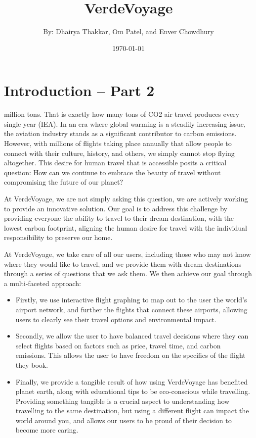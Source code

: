 \documentclass[11pt]{article}
\title{VerdeVoyage}
\author{By: Dhairya Thakkar, Om Patel, and Enver Chowdhury}
\date{\today}
\begin{document}
\maketitle

\section*{Introduction -- Part 2}

 million tons. That is exactly how many tons of CO2 air travel produces every single year (IEA). In an era where global warming is a steadily increasing issue, the aviation industry stands as a significant contributor to carbon emissions. However, with millions of flights taking place annually that allow people to connect with their culture, history, and others, we simply cannot stop flying altogether. This desire for human travel that is accessible posits a critical question: How can we continue to embrace the beauty of travel without compromising the future of our planet?

\medskip

\noindent At VerdeVoyage, we are not simply asking this question, we are actively working to provide an innovative solution. Our goal is to address this challenge by providing everyone the ability to travel to their dream destination, with the lowest carbon footprint, aligning the human desire for travel with the individual responsibility to preserve our home.

\medskip

\noindent At VerdeVoyage, we take care of all our users, including those who may not know where they would like to travel, and we provide them with dream destinations through a series of questions that we ask them. We then achieve our goal through a multi-faceted approach:

\begin{itemize}
    \item Firstly, we use interactive flight graphing to map out to the user the world's airport network, and further the flights that connect these airports, allowing users to clearly see their travel options and environmental impact.
    \item Secondly, we allow the user to have balanced travel decisions where they can select flights based on factors such as price, travel time, and carbon emissions. This allows the user to have freedom on the specifics of the flight they book.
    \item Finally, we provide a tangible result of how using VerdeVoyage has benefited planet earth, along with educational tips to be eco-conscious while travelling. Providing something tangible is a crucial aspect to understanding how travelling to the same destination, but using a different flight can impact the world around you, and allows our users to be proud of their decision to become more caring.
\end{itemize}
\end{document}
